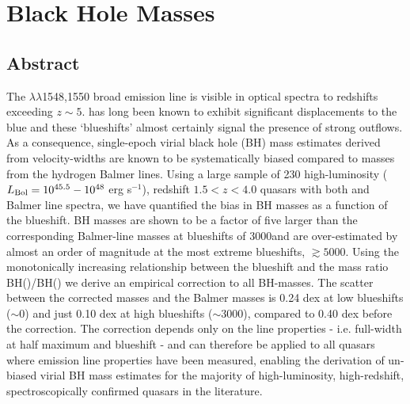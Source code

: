 
\chapter{Black Hole Masses}\label{ch:bhmass} %

\section{Abstract}

The $\lambda\lambda$1548,1550 broad emission line is visible in optical spectra to redshifts exceeding $z\sim5$. 
 has long been known to exhibit significant displacements to the blue and these `blueshifts' almost certainly signal the presence of strong outflows.
As a consequence, single-epoch virial black hole (BH) mass estimates derived from  velocity-widths are known to be systematically biased compared to masses from the hydrogen Balmer lines. 
Using a large sample of 230 high-luminosity ($L_{\rm Bol} = 10^{45.5}-10^{48}$ erg s$^{-1}$), redshift $1.5 < z < 4.0$ quasars with both  and Balmer line spectra, we have quantified the bias in  BH masses as a function of the  blueshift. 
 BH masses are shown to be a factor of five larger than the corresponding Balmer-line masses at  blueshifts of 3000\kms and are over-estimated by almost an order of magnitude at the most extreme blueshifts, $\gtrsim 5000$\kms.
Using the monotonically increasing relationship between the  blueshift and the mass ratio BH()/BH(\hans) we derive an empirical correction to all  BH-masses.
The scatter between the corrected  masses and the Balmer masses is 0.24 dex at low  blueshifts ($\sim$0\kms) and just 0.10 dex at high blueshifts ($\sim$3000\kms), compared to 0.40 dex before the correction. 
The correction depends only on the  line properties - i.e. full-width at half maximum and blueshift - and can therefore be applied to all quasars where  emission line properties have been measured, enabling the derivation of un-biased virial BH mass estimates for the majority of high-luminosity, high-redshift, spectroscopically confirmed quasars in the literature. 


